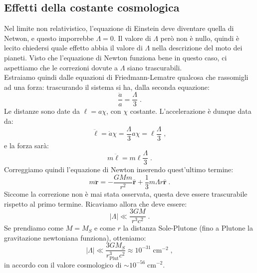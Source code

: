 \documentclass[12pt,a4paper]{report}
\theoremstyle{definition}
\begin{document}
\subsection{Effetti della costante cosmologica}
Nel limite non relativistico, l'equazione di Einstein deve diventare quella di Netwon, e questo imporrebbe $\Lambda=0$. Il valore di $\Lambda$ però non è nullo, quindi è lecito chiedersi quale effetto abbia il valore di $\Lambda$ nella descrizione del moto dei pianeti. Visto che l'equazione di Newton funziona bene in questo caso, ci aspettiamo che le correzioni dovute a $\Lambda$ siano trascurabili. \\
Estraiamo quindi dalle equazioni di Friedmann-Lematre qualcosa che rassomigli ad una forza: trascurando il sistema si ha, dalla seconda equazione:
\begin{equation}
\frac{\ddot{a}}{a}=\frac{\Lambda}{3}\;.
\end{equation}
Le distanze sono date da $\ell=a\chi$, con $\chi$ costante. L'accelerazione è dunque data da:
\begin{equation}
\ddot{\ell}=\ddot{a}\chi=\frac{\Lambda}{3}a\chi=\ell\frac{\Lambda}{3}\;,
\end{equation}
e la forza sarà:
\begin{equation}
m\ddot{\ell}=m\ell\frac{\Lambda}{3}\;.
\end{equation}
Correggiamo quindi l'equazione di Newton inserendo quest'ultimo termine:
\begin{equation}
m\ddot{\mathbf{r}}=-\frac{GMm}{r^2}\hat{\mathbf{r}}+\frac{1}{3}m\Lambda r\hat{\mathbf{r}}\;.
\end{equation}
Siccome la correzione non è mai stata osservata, questa deve essere trascurabile rispetto al primo termine. Ricaviamo allora che deve essere:
\begin{equation}
|\Lambda|\ll \frac{3GM}{r^3c^2}\;.
\end{equation}
Se prendiamo come $M=M_S$ e come $r$ la distanza Sole-Plutone (fino a Plutone la gravitazione newtoniana funziona), otteniamo:
$$
|\Lambda|\ll \frac{3GM_S}{r_{\mathrm{Plut}}^3c^2}\approx 10^{-31}\;\mathrm{cm}^{-2}\;,
$$
in accordo con il valore cosmologico di $\sim 10^{-56}\;\mathrm{cm}^{-2}$.
\end{document}
